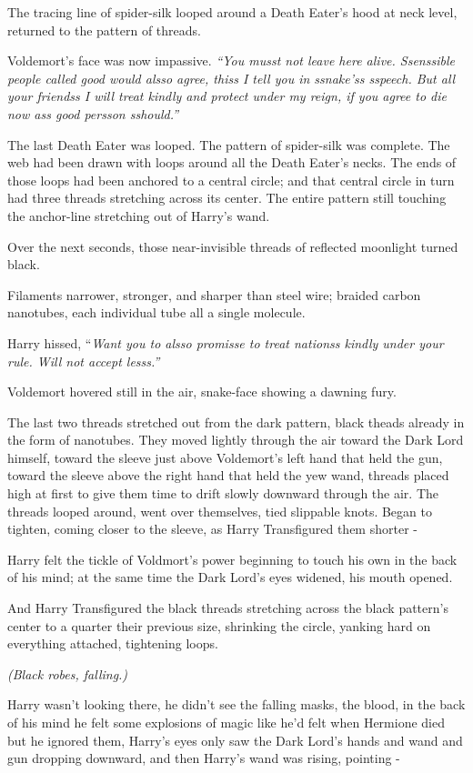 The tracing line of spider-silk looped around a Death Eater's hood at neck level, returned to the pattern of threads.

Voldemort's face was now impassive. \emph{``You musst not leave here alive. Ssenssible people called good would alsso agree, thiss I tell you in ssnake'ss sspeech. But all your friendss I will treat kindly and protect under my reign, if you agree to die now ass good persson sshould.''}

The last Death Eater was looped. The pattern of spider-silk was complete. The web had been drawn with loops around all the Death Eater's necks. The ends of those loops had been anchored to a central circle; and that central circle in turn had three threads stretching across its center. The entire pattern still touching the anchor-line stretching out of Harry's wand.

Over the next seconds, those near-invisible threads of reflected moonlight turned black.

Filaments narrower, stronger, and sharper than steel wire; braided carbon nanotubes, each individual tube all a single molecule.

Harry hissed, ``\emph{Want you to alsso promisse to treat nationss kindly under your rule. Will not accept lesss.''}

Voldemort hovered still in the air, snake-face showing a dawning fury.

The last two threads stretched out from the dark pattern, black theads already in the form of nanotubes. They moved lightly through the air toward the Dark Lord himself, toward the sleeve just above Voldemort's left hand that held the gun, toward the sleeve above the right hand that held the yew wand, threads placed high at first to give them time to drift slowly downward through the air. The threads looped around, went over themselves, tied slippable knots. Began to tighten, coming closer to the sleeve, as Harry Transfigured them shorter -

Harry felt the tickle of Voldmort's power beginning to touch his own in the back of his mind; at the same time the Dark Lord's eyes widened, his mouth opened.

And Harry Transfigured the black threads stretching across the black pattern's center to a quarter their previous size, shrinking the circle, yanking hard on everything attached, tightening loops.

\emph{(Black robes, falling.)}

Harry wasn't looking there, he didn't see the falling masks, the blood, in the back of his mind he felt some explosions of magic like he'd felt when Hermione died but he ignored them, Harry's eyes only saw the Dark Lord's hands and wand and gun dropping downward, and then Harry's wand was rising, pointing -


